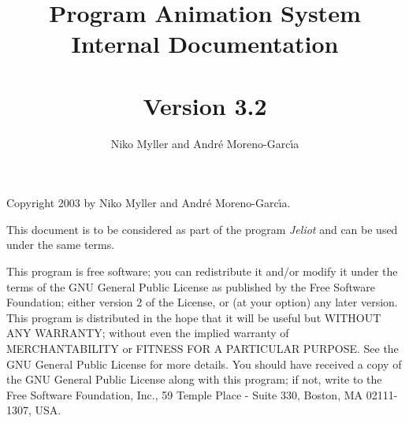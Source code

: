 \documentclass[a4paper, 12pt]{article}
\title{\jel{} Program Animation System\\Internal Documentation\\\mbox{}\\\large{Version 3.2}}
\author{Niko Myller and Andr\'{e} Moreno-Garc\'{\i}a}
\newcommand{\jel}{Jeliot}
\begin{document}
\maketitle
\thispagestyle{empty}

%










\newpage

\thispagestyle{empty} %
\vfil
Copyright 2003 by Niko Myller and Andr\'{e} Moreno-Garc\'{\i}a.
\bigskip

This document is to be considered as part of the program
\emph{\jel} and can be used under the same terms.
\bigskip

This program is free software; you can redistribute it and/or
modify it under the terms of the GNU General Public License
as published by the Free Software Foundation; either version 2
of the License, or (at your option) any later version.
This program is distributed in the hope that it will be useful
but WITHOUT ANY WARRANTY; without even the implied warranty of
MERCHANTABILITY or FITNESS FOR A PARTICULAR PURPOSE.
See the GNU General Public License for more details.
You should have received a copy of the GNU General Public License
along with this program; if not, write to the Free Software
Foundation, Inc., 59 Temple Place - Suite 330, Boston, MA
02111-1307, USA.
\end{document}
